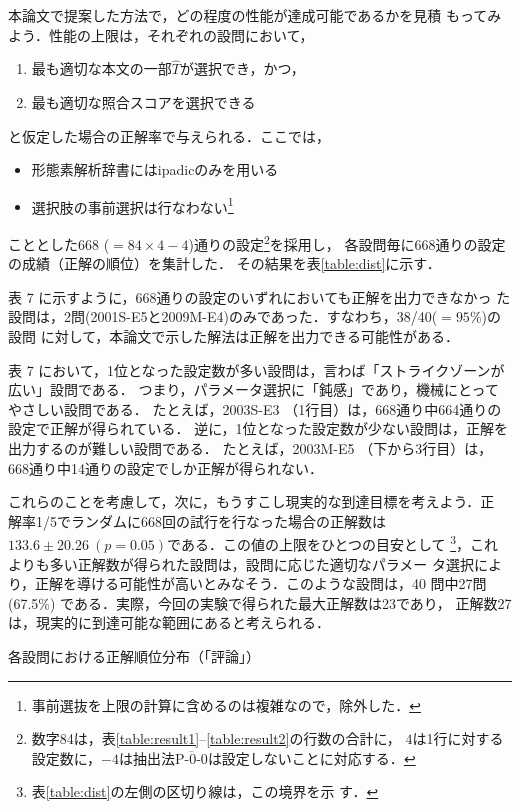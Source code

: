\documentclass[japanese]{jnlp_1.4}
\begin{document}
本論文で提案した方法で，どの程度の性能が達成可能であるかを見積
もってみよう．性能の上限は，それぞれの設問において，
\begin{enumerate}
\item 最も適切な本文の一部$\widehat{T}$が選択でき，かつ，
\item 最も適切な照合スコアを選択できる
\end{enumerate}
と仮定した場合の正解率で与えられる．ここでは，
\begin{itemize}
\item 形態素解析辞書にはipadicのみを用いる
\item 選択肢の事前選択は行なわない\footnote{事前選抜を上限の計算に含めるのは複雑なので，除外した．}
\end{itemize}
こととした668 ($=84\times 4-4$)通りの設定\footnote{
数字84は，表\ref{table:result1}--\ref{table:result2}の行数の合計に，
$4$は1行に対する設定数に，$-4$は抽出法$\overline{\mbox{P-0-0}}$は設定しないことに対応する．}を採用し，
各設問毎に668通りの設定の成績（正解の順位）を集計した．
その結果を表\ref{table:dist}に示す．

表 7 に示すように，668通りの設定のいずれにおいても正解を出力できなかっ
た設問は，\mbox{2問}(2001S-E5と2009M-E4)のみであった．すなわち，38/40(${}=95$\%)の設問
に対して，本論文で示した解法は正解を出力できる可能性がある．

表 7 において，1位となった設定数が多い設問は，言わば「ストライクゾーンが広い」設問である．
つまり，パラメータ選択に「鈍感」であり，機械にとってやさしい設問である．
たとえば，2003S-E3 （1行目）は，668通り中664通りの設定で正解が得られている．
逆に，1位となった設定数が少ない設問は，正解を出力するのが難しい設問である．
たとえば，2003M-E5 （下から3行目）は，668通り中14通りの設定でしか正解が得られない．

これらのことを考慮して，次に，もうすこし現実的な到達目標を考えよう．正
解率1/5でランダムに668回の試行を行なった場合の正解数は$133.6\pm
20.26\: (p=0.05)$である．この値の上限をひとつの目安として
\footnote{表\ref{table:dist}の左側の区切り線は，この境界を示
す．}，これよりも多い正解数が得られた設問は，設問に応じた適切なパラメー
タ選択により，正解を導ける可能性が高いとみなそう．このような設問は，40
問中27問(67.5\%) である．実際，今回の実験で得られた最大正解数は23であり，
正解数27は，現実的に到達可能な範囲にあると考えられる．

\begin{table}[t]
\caption{各設問における正解順位分布（「評論」）}\label{table:dist}

\end{table}
\end{document}
